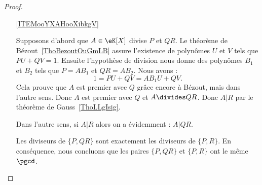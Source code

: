 \begin{proof}
\begin{enumerate}

		\item[\ref{ITEMooYXAHooXibkgV}]

		      Supposons d'abord que \( A\in \eK[X]\) divise \( P\) et \( QR\). Le théorème de Bézout~\ref{ThoBezoutOuGmLB} assure l'existence de polynômes \( U\) et \( V\) tels que \( PU+QV=1\). Ensuite l'hypothèse de division nous donne des polynômes \( B_1\) et \( B_2\) tels que \( P=AB_1\) et \( QR=AB_2\).  Nous avons :
		      \begin{equation}
			      1=PU+QV=AB_1U+QV.
		      \end{equation}
		      Cela prouve que \( A\) est premier avec \( Q\) grâce encore à Bézout, mais dans l'autre sens. Donc \( A\) est premier avec \( Q\) et \( A\divides QR\). Donc \( A|R\) par le théorème de Gauss~\ref{ThoLLgIsig}.

		      Dans l'autre sens, si \( A|R\) alors on a évidemment : \( A|QR\).

		      Les diviseurs de \( \{P,QR\}\) sont exactement les diviseurs de \( \{P,R\}\). En conséquence, nous concluons que les paires \( \{P,QR\}\) et \( \{P,R\}\) ont le même \( \pgcd\).
	\end{enumerate}
\end{proof}
